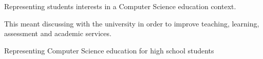 \begin{cventries}
{\begin{cvitems}\item Representing students interests in a Computer Science education context.
\item This meant discussing with the university in order to improve teaching, learning, assessment and academic services.
\item Representing Computer Science education for high school students
\end{cvitems}
}


\end{cventries}
